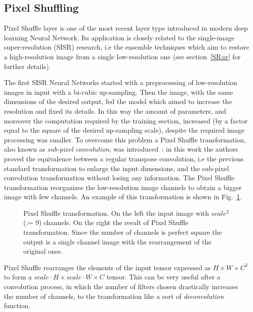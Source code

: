 \documentclass{standalone}
\begin{document}

\subsection[Pixel Shuffling]{Pixel Shuffling}\label{NN:shuffler}

Pixel Shuffle layer is one of the most recent layer type introduced in modern deep learning Neural Network.
Its application is closely related to the single-image super-resolution (SISR) research, i.e the ensemble techniques which aim to restore a high-resolution image from a single low-resolution one (see section~\ref{SR:sr} for further details).

The first SISR Neural Networks started with a preprocessing of low-resolution images in input with a bi-cubic up-sampling.
Then the image, with the same dimensions of the desired output, fed the model which aimed to increase the resolution and fixed its details.
In this way the amount of parameters, and moreover the computation required by the training section, increased (by a factor equal to the square of the desired up-sampling scale), despite the required image processing was smaller.
To overcome this problem a Pixel Shuffle transformation, also known as \emph{sub-pixel convolution}, was introduced~\cite{Wenzhe2016Shuffle}: in this work the authors proved the equivalence between a regular transpose convolution, i.e the previous standard transformation to enlarge the input dimensions, and the sub-pixel convolution transformation without losing any information.
The Pixel Shuffle transformation reorganizes the low-resolution image channels to obtain a bigger image with few channels.
An example of this transformation is shown in Fig.~\ref{fig:pixel_shuffle}.

\begin{figure}[htbp]
\centering
\def\svgwidth{0.7\textwidth}

\caption{Pixel Shuffle transformation.
On the left the input image with $scale^2$ (:= 9) channels.
On the right the result of Pixel Shuffle transformation.
Since the number of channels is perfect square the output is a single channel image with the rearrangement of the original ones.
}
\label{fig:pixel_shuffle}
\end{figure}

Pixel Shuffle rearranges the elements of the input tensor expressed as $H \times W \times C^2$ to form a $scale \cdot H \times scale \cdot W \times C$ tensor.
This can be very useful after a convolution process, in which the number of filters chosen drastically increases the number of channels, to  the transformation like a sort of \emph{deconvolution} function.
\end{document}
